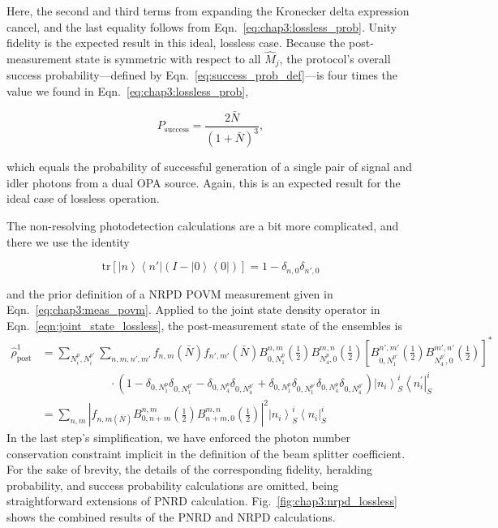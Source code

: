 \documentclass[aps,twocolumn,secnumarabic,amsmath,amssymb,pra,groupedaddress,
showpacs, showkeys]{revtex4-1}
\newcommand{\bra}[1]{\left\langle #1 \right|}
\newcommand{\ket}[1]{\left|#1\right\rangle}
\newcommand{\pna}[1]{\left(#1\right)}
\newcommand{\pnb}[1]{\left[#1\right]}
\newcommand{\eqn}[1]{
\begin{equation}
	#1
\end{equation}
}
\newcommand{\abs}[1]{\left|#1\right|}
\begin{document}
Here, the second and third terms from expanding the Kronecker delta expression
cancel, and the last equality follows from
Eqn.~\ref{eq:chap3:lossless_prob}. Unity fidelity is the expected result in
this ideal, lossless case. Because the post-measurement state is symmetric with
respect to all $\hat{M}_j$, the protocol's overall success
probability---defined by Eqn.~\ref{eq:success_prob_def}---is four times the
value we found in Eqn.~\ref{eq:chap3:lossless_prob},
\eqn{
P_{\textrm{success}}= \frac{2\bar{N}}{\pna{1+\bar{N}}^3},
}
which equals the probability of successful generation of a single pair of
signal and idler photons from a dual OPA source. Again, this is an expected
result for the ideal case of lossless operation. 

The non-resolving photodetection calculations are a bit more complicated, and
there we use the identity
\eqn{
\textrm{tr}\pnb{\ket{n}\bra{n'}\pna{I-\ket{0}\bra{0}}}=1-\delta_{n,0}\delta_{n',0}
}
and the prior definition of a NRPD POVM measurement given in
Eqn.~\ref{eq:chap3:meas_povm}. Applied to the joint state density operator in
Eqn.~\ref{eqn:joint_state_lossless}, the post-measurement state of the
ensembles is
\begin{align}
\hat{\rho}_{\textrm{post}}^{1}& =\sum_{N_i^p, N_i^{p\prime}}\sum_{n,m,n',m'} f_{n,m}\pna{\bar{N}}f_{n',m'}\pna{\bar{N}} B_{0,N_1^p}^{n,m}\pna{\frac{1}{2}}  
B_{N_4^p,0}^{m,n}\pna{\frac{1}{2}}\pnb{B_{0,N_1^{p\prime}}^{n',m'}\pna{\frac{1}{2}}  
B_{N_4^{p\prime},0}^{m',n'}\pna{\frac{1}{2}}}^* \nonumber \\
& \qquad\qquad\qquad\cdot  \pna{1-\delta_{0,N_1^{p}}\delta_{0,N_1^{p\prime}} - \delta_{0,N_4^{p}}\delta_{0,N_4^{p\prime}} + \delta_{0,N_1^{p}}\delta_{0,N_1^{p\prime}} \delta_{0,N_4^{p}}\delta_{0,N_4^{p\prime}}}\ket{n_i}^i_S\bra{n_i^{\prime}}^i_S \nonumber \\
& = \sum_{n,m} \abs{f_{n,m\pna{\bar{N}}} B_{0,n+m}^{n,m}\pna{\frac{1}{2}} B_{n+m,0}^{m,n}\pna{\frac{1}{2} }}^2 \ket{n_i}^i_S\bra{n_i}^i_S
\end{align}
In the last step's simplification, we have enforced the photon number
conservation constraint implicit in the definition of the beam splitter
coefficient. For the sake of brevity, the details of the corresponding
fidelity, heralding probability, and success probability calculations are
omitted, being straightforward extensions of PNRD
calculation. Fig.~\ref{fig:chap3:nrpd_lossless} shows the combined results of
the PNRD and NRPD calculations.
\end{document}
